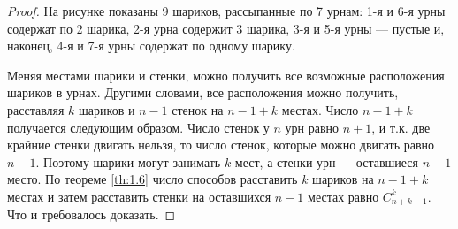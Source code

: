 \begin{proof}
На рисунке показаны 9 шариков, рассыпанные по 7 урнам: 1-я и 6-я урны
содержат по 2 шарика, 2-я урна содержит 3 шарика, 3-я и 5-я урны — пустые
и, наконец, 4-я и 7-я урны содержат по одному шарику.

Меняя местами шарики и стенки, можно получить все возможные расположения шариков в урнах. Другими словами, все расположения можно
получить, расставляя $k$ шариков и $n − 1$ стенок на $n − 1 + k$ местах. Число
$n−1+k$ получается следующим образом. Число стенок у $n$ урн равно $n+1$,
и т.к. две крайние стенки двигать нельзя, то число стенок, которые можно
двигать равно $n − 1$. Поэтому шарики могут занимать $k$ мест, а стенки урн
— оставшиеся $n−1$ место. По теореме \ref{th:1.6} число способов расставить $k$ шариков
на $n − 1 + k$ местах и затем расставить стенки на оставшихся $n − 1$ местах
равно $C^k_{n+k-1}$. Что и требовалось доказать.
\end{proof}
